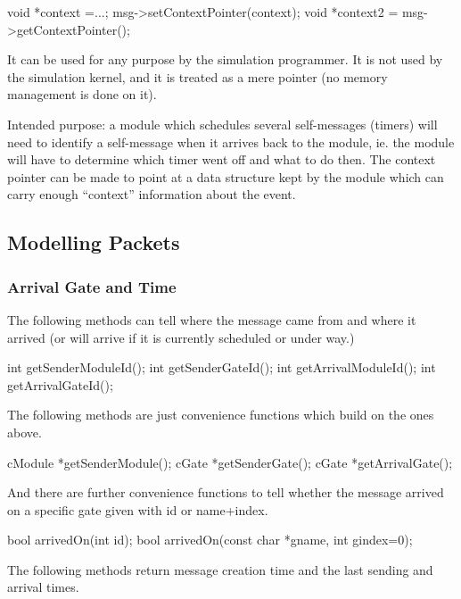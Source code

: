 \begin{cpp}
void *context =...;
msg->setContextPointer(context);
void *context2 = msg->getContextPointer();
\end{cpp}


It can be used for any purpose by the simulation programmer.
It is not used by the simulation kernel, and it is treated as
a mere pointer (no memory management is done on it).

Intended purpose: a module which schedules several self-messages
(timers) will need to identify a self-message when it arrives back to
the module, ie. the module will have to determine which timer went off
and what to do then. The context pointer can be
made to point at a data structure kept by the module which can carry
enough ``context'' information about the event.



\subsection{Modelling Packets}

\subsubsection{Arrival Gate and Time}

The following methods can tell where the message came from and
where it arrived (or will arrive if it is currently scheduled or under way.)

\begin{cpp}
int getSenderModuleId();
int getSenderGateId();
int getArrivalModuleId();
int getArrivalGateId();
\end{cpp}

The following methods are just convenience functions which build
on the ones above.

\begin{cpp}
cModule *getSenderModule();
cGate *getSenderGate();
cGate *getArrivalGate();
\end{cpp}

And there are further convenience functions to tell whether
the message arrived on a specific gate given with id or
name+index.

\begin{cpp}
bool arrivedOn(int id);
bool arrivedOn(const char *gname, int gindex=0);
\end{cpp}

The following methods return message creation time and the last sending
and arrival times.

